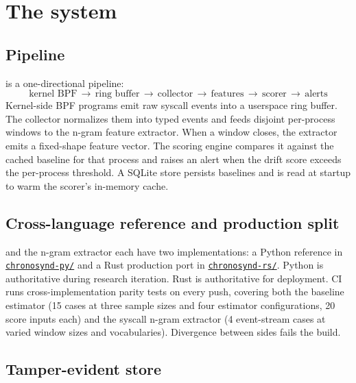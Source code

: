 \section{The \chronosynd{} system}
\label{sec:system}

\subsection{Pipeline}

\chronosynd{} is a one-directional pipeline:
\begin{equation*}
  \text{kernel BPF}
  \,\longrightarrow\,
  \text{ring buffer}
  \,\longrightarrow\,
  \text{collector}
  \,\longrightarrow\,
  \text{features}
  \,\longrightarrow\,
  \text{scorer}
  \,\longrightarrow\,
  \text{alerts}
\end{equation*}
Kernel-side BPF programs emit raw syscall events into a userspace
ring buffer. The collector normalizes them into typed events and
feeds disjoint per-process windows to the n-gram feature extractor.
When a window closes, the extractor emits a fixed-shape feature
vector. The scoring engine compares it against the cached baseline
for that process and raises an alert when the drift score exceeds
the per-process threshold. A SQLite store persists baselines and is
read at startup to warm the scorer's in-memory cache.

\subsection{Cross-language reference and production split}

\sediment{} and the n-gram extractor each have two implementations:
a Python reference in
\href{run:../chronosynd-py/}{\texttt{chronosynd-py/}} and a Rust
production port in
\href{run:../chronosynd-rs/}{\texttt{chronosynd-rs/}}. Python is
authoritative during research iteration. Rust is authoritative for
deployment. CI runs cross-implementation parity tests on every push,
covering both the baseline estimator (15 cases at three sample sizes
and four estimator configurations, 20 score inputs each) and the
syscall n-gram extractor (4 event-stream cases at varied window
sizes and vocabularies). Divergence between sides fails the build.

\subsection{Tamper-evident store}


